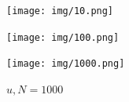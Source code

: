 \documentclass{report}
\begin{document}
\begin{figure}[!htb]
	\texttt{[image: img/10.png]}
	\caption{$u, N = 10$}
	\endminipage\hfill
	\texttt{[image: img/100.png]}
	\caption{$u, N = 100$}
	\endminipage\hfill
	\texttt{[image: img/1000.png]}
	\caption{$u, N = 1000$}
	\endminipage
\end{figure}
\end{document}
